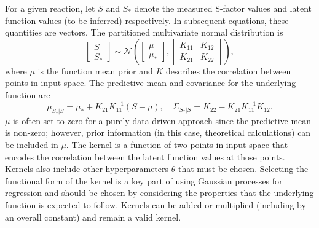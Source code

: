 \documentclass[%
 reprint,
superscriptaddress,
nofootinbib,
 amsmath,amssymb,
 aps,
 pra,
]{revtex4-2}
\begin{document}
For a given reaction, let $S$ and $S_*$ denote the measured S-factor values and latent function values (to be inferred) respectively. In subsequent equations, these quantities are vectors. The partitioned multivariate normal distribution is 
\begin{equation}
	\begin{bmatrix}
   		S \\ S_*
	\end{bmatrix} \sim \mathcal{N} \left( 
	\begin{bmatrix}
    		\mu \\ \mu_*
	\end{bmatrix} , \begin{bmatrix}
    		K_{11} & K_{12} \\ K_{21} & K_{22}
	\end{bmatrix} \right),
\end{equation}
where $\mu$ is the function mean prior and $K$ describes the correlation between points in input space. The predictive mean and covariance for the underlying function are \cite{Rasmussen2006}
\begin{equation}
	\mu_{S_* | S} = \mu_* + K_{21} K_{11}^{-1}(S - \mu), \quad \Sigma_{S_* | S} = K_{22} - K_{21} K_{11}^{-1} K_{12}.
\end{equation}
$\mu$ is often set to zero for a purely data-driven approach since the predictive mean is non-zero; however, prior information (in this case, theoretical calculations) can be included in $\mu$. The kernel is a function of two points in input space that encodes the correlation between the latent function values at those points. Kernels also include other hyperparameters $\theta$ that must be chosen. Selecting the functional form of the kernel is a key part of using Gaussian processes for regression and should be chosen by considering the properties that the underlying function is expected to follow. Kernels can be added or multiplied (including by an overall constant) and remain a valid kernel. 
\end{document}

